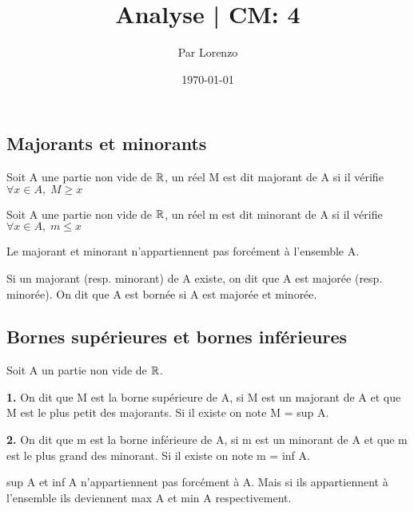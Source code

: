 \documentclass[a4paper, 12pt]{article}
\title{Analyse | CM: 4}
\author{Par Lorenzo}
\date{\today}
\begin{document}
\maketitle

\subsection{Majorants et minorants}

\begin{definition}
    Soit A une partie non vide de $\mathbb{R}$, un réel M est dit majorant de A si il vérifie $\forall x \in A, \; M \geq x$
\end{definition}

\begin{definition}
    Soit A une partie non vide de $\mathbb{R}$, un réel m est dit minorant de A si il vérifie $\forall x \in A, \; m \leq x$
\end{definition}

\begin{remark}
    Le majorant et minorant n'appartiennent pas forcément à l'ensemble A.
\end{remark}

\begin{definition}
    Si un majorant (resp. minorant) de A existe, on dit que A est majorée (resp. minorée). On dit que A est bornée si A est majorée et minorée.
\end{definition}

\subsection{Bornes supérieures et bornes inférieures}

\begin{definition}
    Soit A un partie non vide de $\mathbb{R}$.

    \item \textbf{1.} On dit que M est la borne supérieure de A, si M est un majorant de A et que M est le plus petit des majorants.
        Si il existe on note M = sup A.
    \item \textbf{2.} On dit que m est la borne inférieure de A, si m est un minorant de A et que m est le plus grand des minorant.
        Si il existe on note m = inf A.
\end{definition}

\begin{remark}
    sup A et inf A n'appartiennent pas forcément à A. Mais si ils appartiennent à l'ensemble ils deviennent max A et min A respectivement.
\end{remark}
\end{document}
